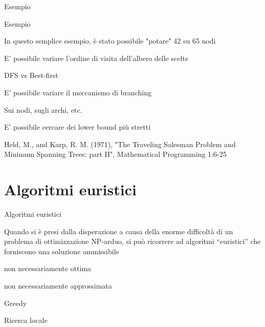 \begin{frame}{Esempio}


\end{frame}

\begin{frame}{Esempio}

\begin{block}{}
In questo semplice esempio, è stato possibile "potare" 42 su 65 nodi
\end{block}

\bigskip
{}
\BIL
\item E' possibile variare l'ordine di visita dell'albero delle scelte
  \BI
  \item DFS vs Best-first
  \EI
\item E' possibile variare il meccanismo di branching
  \BI
  \item Sui nodi, sugli archi, etc.
  \EI
\item E' possibile cercare dei lower bound più stretti 
  \BI
  \item Held, M., and Karp, R. M. (1971), "The Traveling Salesman Problem and Minimum Spanning Trees: part II", Mathematical Programming 1:6-25
  \EI
\EIL

\end{frame}



\section{Algoritmi euristici}

\begin{frame}{Algoritmi euristici}

\begin{block}{}
Quando si è presi dalla disperazione a causa della enorme difficoltà di un
problema di ottimizzazione NP-arduo, si può ricorrere ad algoritmi
``euristici'' che forniscono una soluzione ammissibile
\BIL
\item non necessariamente ottima 
\item non necessariamente approssimata 
\EI
\end{block}

\bigskip
{}
\BIL
\item Greedy
\item Ricerca locale
\EIL
    
\end{frame}

